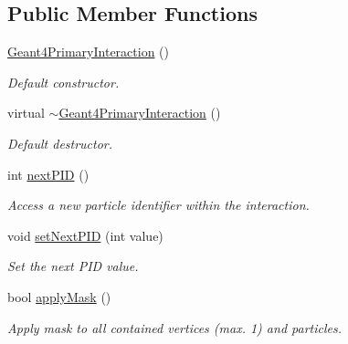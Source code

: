 \subsection*{Public Member Functions}
\begin{DoxyCompactItemize}
\item 
\hyperlink{class_d_d4hep_1_1_simulation_1_1_geant4_primary_interaction_adc7aaf8a360e02d21799182baee96792}{Geant4\+Primary\+Interaction} ()
\begin{DoxyCompactList}\small\item\em Default constructor. \end{DoxyCompactList}\item 
virtual \hyperlink{class_d_d4hep_1_1_simulation_1_1_geant4_primary_interaction_a8e8464271e737da64d13db8d0c926436}{$\sim$\+Geant4\+Primary\+Interaction} ()
\begin{DoxyCompactList}\small\item\em Default destructor. \end{DoxyCompactList}\item 
int \hyperlink{class_d_d4hep_1_1_simulation_1_1_geant4_primary_interaction_a2edc81343a8d45ba50ea4ae95cb636c2}{next\+P\+ID} ()
\begin{DoxyCompactList}\small\item\em Access a new particle identifier within the interaction. \end{DoxyCompactList}\item 
void \hyperlink{class_d_d4hep_1_1_simulation_1_1_geant4_primary_interaction_a18973191ce0e16877f95654c4ee56a30}{set\+Next\+P\+ID} (int value)
\begin{DoxyCompactList}\small\item\em Set the next P\+ID value. \end{DoxyCompactList}\item 
bool \hyperlink{class_d_d4hep_1_1_simulation_1_1_geant4_primary_interaction_adcf2faaa67296efa47035fb2c00719a6}{apply\+Mask} ()
\begin{DoxyCompactList}\small\item\em Apply mask to all contained vertices (max. 1) and particles. \end{DoxyCompactList}\end{DoxyCompactItemize}
